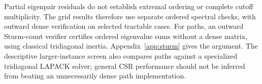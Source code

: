 \begin{table}[t]\centering\small
\caption{Sparse confirmation. Times are medians of three runs in seconds;
the ratio is dense partial divided by CSR/ARPACK. A ratio above one favors
the sparse backend. Each row has two sites and two presets.}
\label{tab:sparse}
\end{table}



Partial eigenpair residuals do not establish extremal ordering or complete
cutoff multiplicity. The grid results therefore use separate ordered
spectral checks, with outward dense verification on selected tractable
cases. For paths, an outward Sturm-count verifier certifies ordered
eigenvalue sums without a dense matrix, using classical tridiagonal
inertia\cite{demmel1993}. Appendix~\ref{app:sturm} gives the argument.
The descriptive larger-instance screen also compares paths against a
specialized tridiagonal LAPACK solver; general CSR performance should not
be inferred from beating an unnecessarily dense path implementation.

\begin{table}[t]\centering\small
\caption{Descriptive scaling screen: one solve per method and case,
$r=2$, two sites, $K=2$. These are single observations, not repeated
confirmation estimates. Retained memory counts input, spectrum-cache peak,
and final basis-sample arrays, not peak process RSS.}
\label{tab:sparse-scaling}
\end{table}


